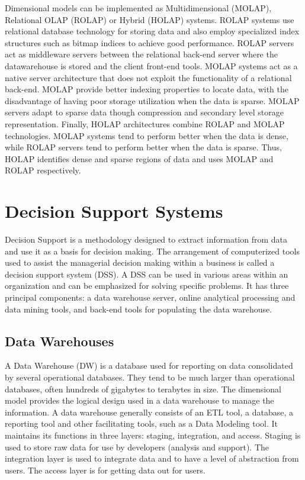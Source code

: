 \documentclass[]{article}
\begin{document}
Dimensional models can be implemented as Multidimensional (MOLAP), Relational OLAP (ROLAP) or Hybrid (HOLAP) systems. ROLAP systems use
relational database technology for storing data and also employ specialized index structures such as bitmap indices to achieve good
performance. ROLAP servers act as middleware servers between the relational back-end server where the datawarehouse is stored and the
client front-end tools. MOLAP systems act as a native server architecture that does not exploit the functionality of a relational
back-end. MOLAP provide better indexing properties to locate data, with the disadvantage of having poor storage utilization when the
data is sparse. MOLAP servers adapt to sparse data though compression and secondary level storage representation. Finally, HOLAP
architectures combine ROLAP and MOLAP technologies. MOLAP systems tend to perform better when the data is dense, while ROLAP servers
tend to perform better when the data is sparse. Thus, HOLAP identifies dense and sparse regions of data and uses MOLAP and ROLAP
respectively.



\section{Decision Support Systems} %
\label{sec:decision_support_systems}

Decision Support is a methodology designed to extract information from data and use it as a basis for decision making. The arrangement
of computerized tools used to assist the managerial decision making within a business is called a decision support system (DSS). A DSS
can be used in various areas within an organization and can be emphasized for solving specific problems. It has three principal
components: a data warehouse server, online analytical processing and data mining tools, and back-end tools for populating the data
warehouse.


\subsection{Data Warehouses} %
\label{sub:data_warehouses}

A Data Warehouse (DW) is a database used for reporting on data consolidated by several operational databases. They tend to be much
larger than operational databases, often hundreds of gigabytes to terabytes in size. The dimensional model provides the logical design
used in a data warehouse to manage the information. A data warehouse generally consists of an ETL tool, a database, a reporting tool and
other facilitating tools, such as a Data Modeling tool. It maintains its functions in three layers: staging, integration, and access.
Staging is used to store raw data for use by developers (analysis and support). The integration layer is used to integrate data and to
have a level of abstraction from users. The access layer is for getting data out for users.
\end{document}
